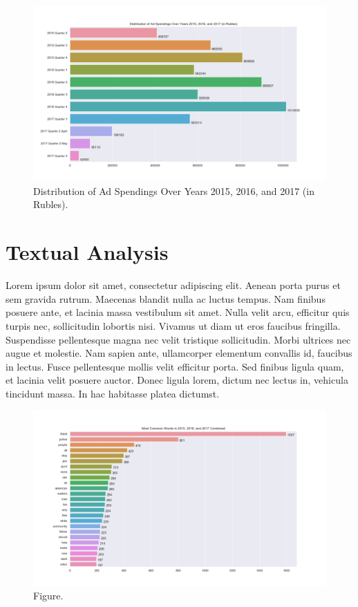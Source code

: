 \documentclass[12pt]{article}
\theoremstyle{definition}
\begin{document}
\begin{figure}[H]
\centering
\includegraphics[width=\textwidth]{../visualization/barchart-plots/barchart_ad_spend_RU_distribution.png}
\caption*{Distribution of Ad Spendings Over Years 2015, 2016, and 2017 (in Rubles).}
\end{figure}


\section*{\centering Textual Analysis}
Lorem ipsum dolor sit amet, consectetur adipiscing elit.
Aenean porta purus et sem gravida rutrum.
Maecenas blandit nulla ac luctus tempus.
Nam finibus posuere ante, et lacinia massa vestibulum sit amet.
Nulla velit arcu, efficitur quis turpis nec, sollicitudin lobortis nisi.
Vivamus ut diam ut eros faucibus fringilla.
Suspendisse pellentesque magna nec velit tristique sollicitudin.
Morbi ultrices nec augue et molestie.
Nam sapien ante, ullamcorper elementum convallis id, faucibus in lectus.
Fusce pellentesque mollis velit efficitur porta.
Sed finibus ligula quam, et lacinia velit posuere auctor.
Donec ligula lorem, dictum nec lectus in, vehicula tincidunt massa.
In hac habitasse platea dictumst.

\begin{figure}[H]
\centering
\includegraphics[width=\textwidth]{../visualization/barchart-plots/barchart_word_counts.png}
\caption*{Figure.}
\end{figure}
\end{document}
